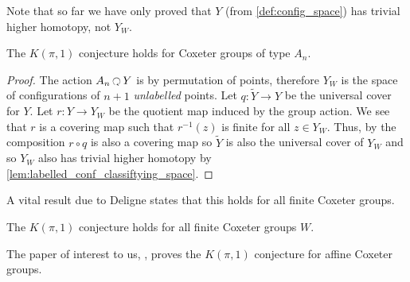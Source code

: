 \documentclass[class=article, crop=false]{standalone}
\begin{document}
Note that so far we have only proved that $Y$ (from \cref{def:config_space}) has trivial higher homotopy, not $Y_W$.

\begin{theorem}
	The $K(\pi,1)$ conjecture holds for Coxeter groups of type $A_n$.
\end{theorem}
\begin{proof}
	The action $A_n \acts Y$ is by permutation of points, therefore $Y_W$ is the space of configurations of $n+1$ \emph{unlabelled} points. Let $q \colon \tilde{Y} \to Y$ be the universal cover for $Y$. Let $r \colon Y \to Y_W$ be the quotient map induced by the group action. We see that $r$ is a covering map such that $r^{-1}(z)$ is finite for all $z \in Y_W$. Thus, by \cite[Exercise 53.4]{munkres_topology_2000} the composition $r \circ q$ is also a covering map so $\tilde{Y}$ is also the universal cover of $Y_W$ and so $Y_W$ also has trivial higher homotopy by \cref{lem:labelled_conf_classiftying_space}.
\end{proof}

A vital result due to Deligne states that this holds for all finite Coxeter groups.
\begin{theorem}
	The $K(\pi,1)$ conjecture holds for all finite Coxeter groups $W$.
	\label{thm:k_pi_1_finite}
\end{theorem}

The paper of interest to us, \cite{paolini_salvetti_kpi1_2021}, proves the $K(\pi,1)$ conjecture for affine Coxeter groups. 
\end{document}
